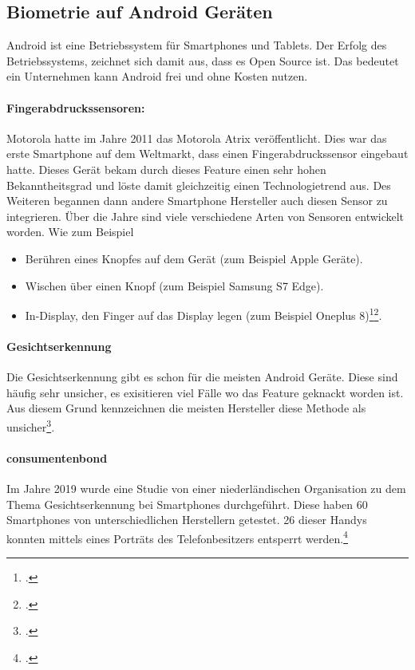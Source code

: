 \subsection{Biometrie auf Android Geräten}
Android ist eine Betriebssystem für Smartphones und Tablets. Der Erfolg des Betriebssystems, zeichnet sich damit aus, dass es Open Source ist. Das bedeutet ein Unternehmen kann Android frei und ohne Kosten nutzen.
\paragraph{Fingerabdruckssensoren:}
Motorola hatte im Jahre 2011 das Motorola Atrix veröffentlicht. Dies war das erste Smartphone auf dem Weltmarkt, dass einen Fingerabdruckssensor eingebaut hatte.
Dieses Gerät bekam durch dieses Feature einen sehr hohen Bekanntheitsgrad und löste damit gleichzeitig einen Technologietrend aus.
Des Weiteren begannen dann andere Smartphone Hersteller auch diesen Sensor zu integrieren.
Über die Jahre sind viele verschiedene Arten von Sensoren entwickelt worden. Wie zum Beispiel
\begin{itemize}
	\item Berühren eines Knopfes auf dem Gerät (zum Beispiel Apple Geräte).
	\item Wischen über einen Knopf (zum Beispiel Samsung S7 Edge).
	\item In-Display, den Finger auf das Display legen (zum Beispiel Oneplus 8)\footcite{fingerabdruck-android-1}\footcite{fingerabdruck-android-2}. 
\end{itemize}
\paragraph{Gesichtserkennung}
Die Gesichtserkennung gibt es schon für die meisten Android Geräte. Diese sind häufig sehr unsicher, es exisitieren viel Fälle wo das Feature geknackt worden ist. Aus diesem Grund kennzeichnen die meisten Hersteller diese Methode als unsicher\footcite{gesichtserkennung-android}. 

\paragraph{consumentenbond}
Im Jahre 2019 wurde eine Studie von einer niederländischen Organisation zu dem Thema Gesichtserkennung bei Smartphones durchgeführt. 
Diese haben 60 Smartphones von unterschiedlichen Herstellern getestet. 26 dieser Handys konnten mittels eines Porträts des Telefonbesitzers entsperrt werden.\footcite{consumentenbond}


